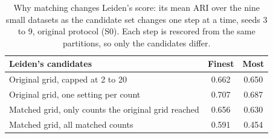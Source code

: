 \begin{table}[t]
\centering
\caption{Why matching changes Leiden's score: its mean ARI over the nine small datasets as the candidate set changes one step at a time, seeds 3 to 9, original protocol (S0). Each step is rescored from the same partitions, so only the candidates differ.}
\label{tab:decomp}
\footnotesize
\setlength{\tabcolsep}{4pt}
\begin{tabular}{lcc}
\toprule
Leiden's candidates & Finest & Most \\
\midrule
Original grid, capped at 2 to 20 & 0.662 & 0.650 \\
Original grid, one setting per count & 0.707 & 0.687 \\
Matched grid, only counts the original grid reached & 0.656 & 0.630 \\
Matched grid, all matched counts & 0.591 & 0.454 \\
\bottomrule
\end{tabular}
\end{table}
